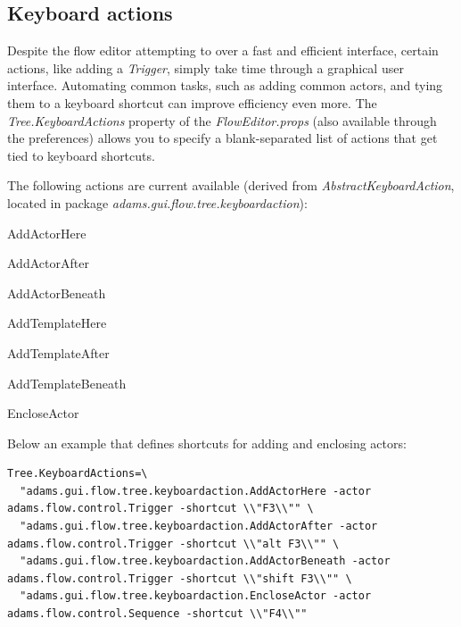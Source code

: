 \subsection{Keyboard actions}
\label{floweditor_keyboardactions}
Despite the flow editor attempting to over a fast and efficient interface,
certain actions, like adding a \textit{Trigger}, simply take time through
a graphical user interface. Automating common tasks, such as adding common
actors, and tying them to a keyboard shortcut can improve efficiency even more.
The \textit{Tree.KeyboardActions} property of the \textit{FlowEditor.props}
(also available through the preferences) allows you to specify a blank-separated
list of actions that get tied to keyboard shortcuts.

The following actions are current available (derived from \textit{AbstractKeyboardAction},
located in package \textit{adams.gui.flow.tree.keyboardaction}):
\begin{tight_itemize}
  \item AddActorHere
  \item AddActorAfter
  \item AddActorBeneath
  \item AddTemplateHere
  \item AddTemplateAfter
  \item AddTemplateBeneath
  \item EncloseActor
\end{tight_itemize}
Below an example that defines shortcuts for adding and enclosing actors:
{\scriptsize
\begin{verbatim}
Tree.KeyboardActions=\
  "adams.gui.flow.tree.keyboardaction.AddActorHere -actor adams.flow.control.Trigger -shortcut \\"F3\\"" \
  "adams.gui.flow.tree.keyboardaction.AddActorAfter -actor adams.flow.control.Trigger -shortcut \\"alt F3\\"" \
  "adams.gui.flow.tree.keyboardaction.AddActorBeneath -actor adams.flow.control.Trigger -shortcut \\"shift F3\\"" \
  "adams.gui.flow.tree.keyboardaction.EncloseActor -actor adams.flow.control.Sequence -shortcut \\"F4\\""
\end{verbatim}
}

